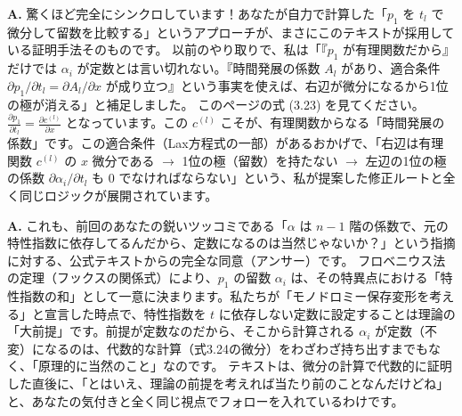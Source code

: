 \vspace{2em}

\begin{Q}
\textbf{A.} 驚くほど完全にシンクロしています！あなたが自力で計算した「$p_1$ を $t_l$ で微分して留数を比較する」というアプローチが、まさにこのテキストが採用している証明手法そのものです。
以前のやり取りで、私は「『$p_1$ が有理関数だから』だけでは $\alpha_i$ が定数とは言い切れない。『時間発展の係数 $A_l$ があり、適合条件 $\partial p_1/\partial t_l = \partial A_l/\partial x$ が成り立つ』という事実を使えば、右辺が微分になるから1位の極が消える」と補足しました。
このページの式 (3.23) を見てください。$\frac{\partial p_1}{\partial t_l} = \frac{\partial c^{(l)}}{\partial x}$ となっています。この $c^{(l)}$ こそが、有理関数からなる「時間発展の係数」です。この適合条件（Lax方程式の一部）があるおかげで、「右辺は有理関数 $c^{(l)}$ の $x$ 微分である $\to$ 1位の極（留数）を持たない $\to$ 左辺の1位の極の係数 $\partial \alpha_i / \partial t_l$ も $0$ でなければならない」という、私が提案した修正ルートと全く同じロジックが展開されています。
\end{Q}

\begin{Q}
\textbf{A.} これも、前回のあなたの鋭いツッコミである「$\alpha$ は $n-1$ 階の係数で、元の特性指数に依存してるんだから、定数になるのは当然じゃないか？」という指摘に対する、公式テキストからの完全な同意（アンサー）です。
フロベニウス法の定理（フックスの関係式）により、$p_1$ の留数 $\alpha_i$ は、その特異点における「特性指数の和」として一意に決まります。私たちが「モノドロミー保存変形を考える」と宣言した時点で、特性指数を $t$ に依存しない定数に設定することは理論の「大前提」です。前提が定数なのだから、そこから計算される $\alpha_i$ が定数（不変）になるのは、代数的な計算（式3.24の微分）をわざわざ持ち出すまでもなく、「原理的に当然のこと」なのです。
テキストは、微分の計算で代数的に証明した直後に、「とはいえ、理論の前提を考えれば当たり前のことなんだけどね」と、あなたの気付きと全く同じ視点でフォローを入れているわけです。
\end{Q}

